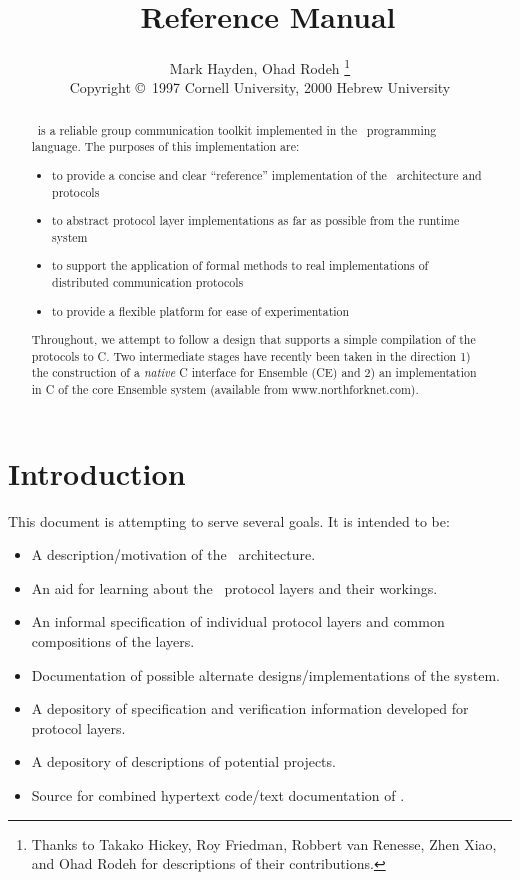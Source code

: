 \documentclass[11pt]{article}
\title{\ensemble\ Reference Manual}
\author{Mark Hayden, Ohad Rodeh 
\thanks{Thanks to Takako Hickey, Roy Friedman, Robbert van Renesse,
Zhen Xiao, and Ohad Rodeh for descriptions of their contributions.} \\
\small{Copyright \copyright\ 1997 Cornell University,
                             2000 Hebrew  University}
}
\begin{document}
\maketitle

\begin{abstract}
\ensemble\ is a reliable group communication toolkit implemented in the
\caml\ programming language.  The purposes of this implementation are:
\begin{itemize}
\item 
to provide a concise and clear ``reference'' implementation of the \ensemble\
architecture and protocols
\item 
to abstract protocol layer implementations as far as possible from the
runtime system
\item
to support the application of formal methods to real implementations of
distributed communication protocols
\item 
to provide a flexible platform for ease of experimentation
\end{itemize}
Throughout, we attempt to follow a design that supports a simple
compilation of the protocols to C. Two intermediate stages have
recently been taken in the direction 1) the construction of a {\it
native} C interface for Ensemble (CE) and 2) an implementation in C of
the core Ensemble system (available from www.northforknet.com).
\end{abstract}

\newpage
\tableofcontents
\newpage

\section{Introduction}

This document is attempting to serve several goals.  It is intended to be:
\begin{itemize}
\item
A description/motivation of the \ensemble\ architecture.
\item
An aid for learning about the \ensemble\ protocol layers and their workings.
\item
An informal specification of individual protocol layers and common
compositions of the layers.
\item
Documentation of possible alternate designs/implementations of the system.
\item
A depository of specification and verification information developed for
protocol layers.
\item
A depository of descriptions of potential projects.
\item
Source for combined hypertext code/text documentation of \ensemble.
\end{itemize}
\end{document}
